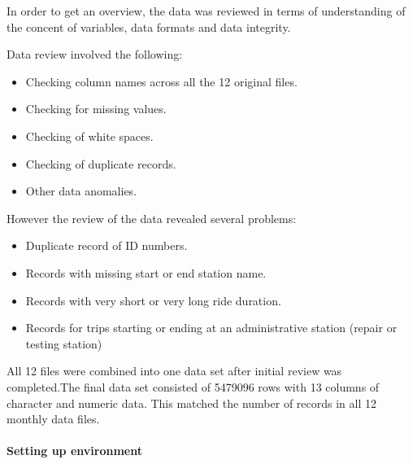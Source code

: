 \documentclass[
]{article}
\providecommand{\tightlist}{%
  \setlength{\itemsep}{0pt}\setlength{\parskip}{0pt}}
\begin{document}
In order to get an overview, the data was reviewed in terms of
understanding of the concent of variables, data formats and data
integrity.

Data review involved the following:

\begin{itemize}
\tightlist
\item
  Checking column names across all the 12 original files.
\item
  Checking for missing values.
\item
  Checking of white spaces.
\item
  Checking of duplicate records.
\item
  Other data anomalies.
\end{itemize}

However the review of the data revealed several problems:

\begin{itemize}
\tightlist
\item
  Duplicate record of ID numbers.
\item
  Records with missing start or end station name.
\item
  Records with very short or very long ride duration.
\item
  Records for trips starting or ending at an administrative station
  (repair or testing station)
\end{itemize}

All 12 files were combined into one data set after initial review was
completed.The final data set consisted of 5479096 rows with 13 columns
of character and numeric data. This matched the number of records in all
12 monthly data files.

\hypertarget{setting-up-environment}{%
\paragraph{\texorpdfstring{\textbf{Setting up
environment}}{Setting up environment}}\label{setting-up-environment}}
\end{document}
